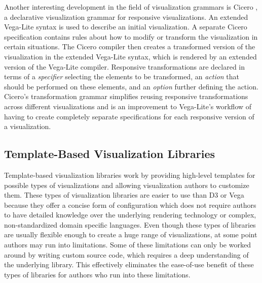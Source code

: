 \begin{samepage}
%
A Vega-Lite specification of the Vega bar chart shown in
Listings~\ref{list:VegaStaticBarChart} and~\ref{list:VegaBarChart}
combined.
},
]{listings/vega-lite-bar-chart.json}
\end{samepage}



Another interesting development in the field of visualization grammars
is Cicero \parencite{Cicero}, a declarative visualization grammar for
responsive visualizations. An extended Vega-Lite syntax is used to
describe an initial visualization. A separate Cicero specification
contains rules about how to modify or transform the visualization in
certain situations. The Cicero compiler then creates a transformed
version of the visualization in the extended Vega-Lite syntax, which
is rendered by an extended version of the Vega-Lite compiler.
%
Responsive transformations are declared in terms of a \emph{specifier}
selecting the elements to be transformed, an \emph{action} that should
be performed on these elements, and an \emph{option} further defining
the action. Cicero's transformation grammar simplifies reusing
responsive transformations across different visualizations and is an
improvement to Vega-Lite's workflow of having to create completely
separate specifications for each responsive version of a
visualization.









\subsection{Template-Based Visualization Libraries}

Template-based visualization libraries work by providing high-level
templates for possible types of visualizations and allowing
visualization authors to customize them. These types of visualization
libraries are easier to use than D3 or Vega because they offer a
concise form of configuration which does not require authors to have
detailed knowledge over the underlying rendering technology or
complex, non-standardized domain specific languages. Even though these
types of libraries are usually flexible enough to create a huge range
of visualizations, at some point authors may run into limitations.
Some of these limitations can only be worked around by writing custom
source code, which requires a deep understanding of the underlying
library. This effectively eliminates the ease-of-use benefit of these
types of libraries for authors who run into these limitations.

